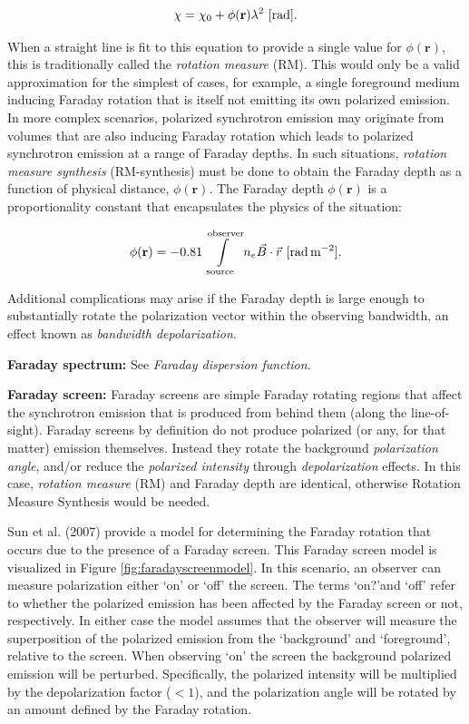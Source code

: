 \documentclass[a4paper,10pt]{article}
\begin{document}
\begin{align*}
    \chi = \chi_0 + \phi(\mathbf{r}) \lambda^2 ~[{\rm rad}].
\end{align*}

{\noindent}When a straight line is fit to this equation to provide a single value for $\phi(\mathbf{r})$, this is traditionally called the \textit{rotation measure} (RM). This would only be a valid approximation for the simplest of cases, for example, a single foreground medium inducing Faraday rotation that is itself not emitting its own polarized emission. In more complex scenarios, polarized synchrotron emission may originate from volumes that are also inducing Faraday rotation which leads to polarized synchrotron emission at a range of Faraday depths. In such situations, \textit{rotation measure synthesis} (RM-synthesis) must be done to obtain the Faraday depth as a function of physical distance, $\phi(\mathbf{r})$. The Faraday depth $\phi(\mathbf{r})$ is a proportionality constant that encapsulates the physics of the situation:

\begin{align*}
    \phi(\mathbf{r}) = -0.81 \int\limits_\mathrm{source}^\mathrm{observer}n_e\vec{B}\cdot\vec{{\rm }r} ~ [{\rm rad\,m^{-2}}].
\end{align*}

{\noindent}Additional complications may arise if the Faraday depth is large enough to substantially rotate the polarization vector within the observing bandwidth, an effect known as \textit{bandwidth depolarization}.

{\noindent}\textbf{Faraday spectrum:} See \textit{Faraday dispersion function}.

{\noindent}\textbf{Faraday screen:} Faraday screens are simple Faraday rotating regions that affect the synchrotron emission that is produced from behind them (along the line-of-sight). Faraday screens by definition do not produce polarized (or any, for that matter) emission themselves. Instead they rotate the background \textit{polarization angle}, and/or reduce the \textit{polarized intensity} through \textit{depolarization} effects. In this case, \textit{rotation measure} (RM) and Faraday depth are identical, otherwise Rotation Measure Synthesis would be needed. 

{\noindent}Sun et al. (2007) provide a model for determining the Faraday rotation that occurs due to the presence of a Faraday screen. This Faraday screen model is visualized in Figure \ref{fig:faradayscreenmodel}. In this scenario, an observer can measure polarization either `on' or `off' the screen. The terms `on?'and `off' refer to whether the polarized emission has been affected by the Faraday screen or not, respectively. In either case the model assumes that the observer will measure the superposition of the polarized emission from the `background' and `foreground', relative to the screen. When observing `on' the screen the background polarized emission will be perturbed. Specifically, the polarized intensity will be multiplied by the depolarization factor ($<1$), and the polarization angle will be rotated by an amount defined by the Faraday rotation.
\end{document}
